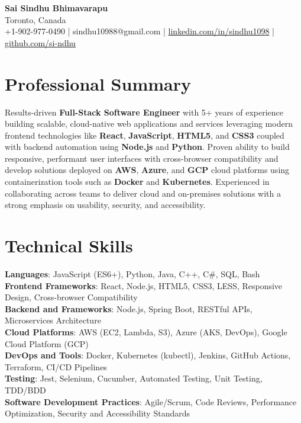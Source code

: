 \documentclass[letterpaper,11pt]{article}
\begin{document}
\begin{center}
  {\Large \textbf{Sai Sindhu Bhimavarapu}} \\
  Toronto, Canada \\
  +1-902-977-0490 \enspace | \enspace sindhu10988@gmail.com \enspace | \enspace \href{https://www.linkedin.com/in/sindhu1098/}{linkedin.com/in/sindhu1098} \enspace | \enspace \href{https://github.com/si-ndhu}{github.com/si-ndhu}
\end{center}

\section{Professional Summary}
  \begin{itemize}[leftmargin=0.15in, label={}]
    \small{\item{
     Results-driven \textbf{Full-Stack Software Engineer} with 5+ years of experience building scalable, cloud-native web applications and services leveraging modern frontend technologies like \textbf{React}, \textbf{JavaScript}, \textbf{HTML5}, and \textbf{CSS3} coupled with backend automation using \textbf{Node.js} and \textbf{Python}. Proven ability to build responsive, performant user interfaces with cross-browser compatibility and develop solutions deployed on \textbf{AWS}, \textbf{Azure}, and \textbf{GCP} cloud platforms using containerization tools such as \textbf{Docker} and \textbf{Kubernetes}. Experienced in collaborating across teams to deliver cloud and on-premises solutions with a strong emphasis on usability, security, and accessibility.
    }}
  \end{itemize}
\vspace{-16pt}

\section{Technical Skills}
 \begin{itemize}[leftmargin=0.15in, label={}]
    \small{\item{
     \textbf{Languages}: JavaScript (ES6+), Python, Java, C++, C\#, SQL, Bash \\
     \textbf{Frontend Frameworks}: React, Node.js, HTML5, CSS3, LESS, Responsive Design, Cross-browser Compatibility \\
     \textbf{Backend and Frameworks}: Node.js, Spring Boot, RESTful APIs, Microservices Architecture \\
     \textbf{Cloud Platforms}: AWS (EC2, Lambda, S3), Azure (AKS, DevOps), Google Cloud Platform (GCP) \\
     \textbf{DevOps and Tools}: Docker, Kubernetes (kubectl), Jenkins, GitHub Actions, Terraform, CI/CD Pipelines \\
     \textbf{Testing}: Jest, Selenium, Cucumber, Automated Testing, Unit Testing, TDD/BDD \\
     \textbf{Software Development Practices}: Agile/Scrum, Code Reviews, Performance Optimization, Security and Accessibility Standards
    }}
 \end{itemize}
\vspace{-16pt}
\end{document}
